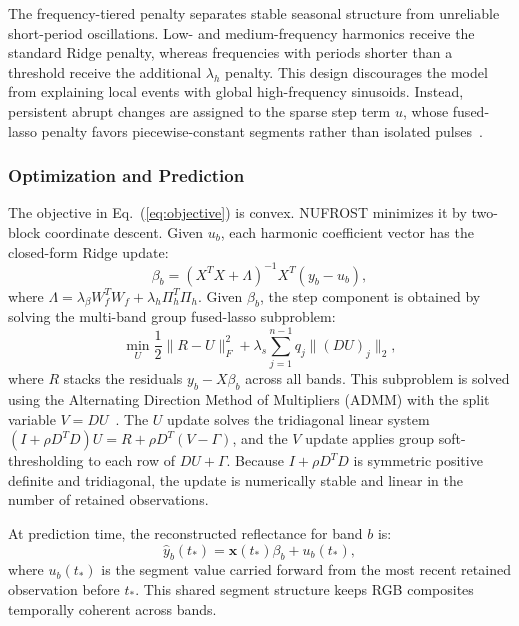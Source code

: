 \documentclass[letterpaper,journal]{IEEEtran}
\begin{document}
The frequency-tiered penalty separates stable seasonal structure from unreliable short-period oscillations. Low- and medium-frequency harmonics receive the standard Ridge penalty, whereas frequencies with periods shorter than a threshold receive the additional $\lambda_h$ penalty. This design discourages the model from explaining local events with global high-frequency sinusoids. Instead, persistent abrupt changes are assigned to the sparse step term $u$, whose fused-lasso penalty favors piecewise-constant segments rather than isolated pulses~\cite{ref15}.

\subsubsection{Optimization and Prediction}
The objective in Eq.~(\ref{eq:objective}) is convex. NUFROST minimizes it by two-block coordinate descent. Given $u_b$, each harmonic coefficient vector has the closed-form Ridge update:
\begin{equation}
\label{eq:beta_update}
\beta_b = (X^T X + \Lambda)^{-1}X^T(y_b-u_b),
\end{equation}
where $\Lambda=\lambda_{\beta}W_f^T W_f+\lambda_h\Pi_h^T\Pi_h$. Given $\beta_b$, the step component is obtained by solving the multi-band group fused-lasso subproblem:
\begin{equation}
\label{eq:step_subproblem}
\min_U \frac{1}{2}\|R-U\|_F^2 + \lambda_s\sum_{j=1}^{n-1} q_j\|(DU)_j\|_2,
\end{equation}
where $R$ stacks the residuals $y_b-X\beta_b$ across all bands. This subproblem is solved using the Alternating Direction Method of Multipliers (ADMM) with the split variable $V=DU$~\cite{ref16}. The $U$ update solves the tridiagonal linear system $(I+\rho D^TD)U=R+\rho D^T(V-\Gamma)$, and the $V$ update applies group soft-thresholding to each row of $DU+\Gamma$. Because $I+\rho D^TD$ is symmetric positive definite and tridiagonal, the update is numerically stable and linear in the number of retained observations.

At prediction time, the reconstructed reflectance for band $b$ is:
\begin{equation}
\label{eq:prediction}
\hat{y}_b(t_*)=\mathbf{x}(t_*)\beta_b+u_b(t_*),
\end{equation}
where $u_b(t_*)$ is the segment value carried forward from the most recent retained observation before $t_*$. This shared segment structure keeps RGB composites temporally coherent across bands.
\end{document}
